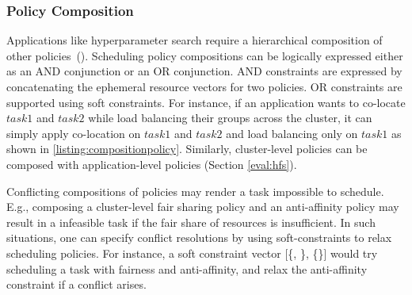 \subsubsection{Policy Composition}
Applications like hyperparameter search require a hierarchical composition of other policies~().
Scheduling policy compositions can be logically expressed either as an AND conjunction or an OR conjunction. AND constraints are expressed by concatenating the ephemeral resource vectors for two policies. OR constraints are supported using soft constraints. %
For instance, if an application wants to co-locate $task1$ and $task2$ while load balancing their groups across the cluster, it can simply apply co-location on $task1$ and $task2$ and load balancing only on $task1$ as shown in \cref{listing:compositionpolicy}. Similarly, cluster-level policies can be composed with application-level policies (Section \ref{eval:hfs}). 

Conflicting compositions of policies may render a task impossible to schedule. E.g., composing a cluster-level fair sharing policy and an anti-affinity policy may result in a infeasible task if the fair share  of resources is insufficient. In such situations, one can specify conflict resolutions by using soft-constraints to relax scheduling policies. For instance, a soft constraint vector [\{, \}, \{\}] would try scheduling a task with fairness and anti-affinity, and relax the anti-affinity constraint if a conflict arises. 

